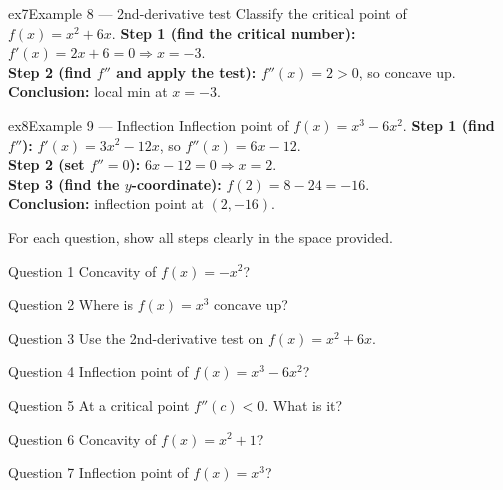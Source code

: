 \documentclass[11pt]{article}
\begin{document}
\begin{example}{ex7}{Example 8 --- 2nd-derivative test}
Classify the critical point of $f(x)=x^2+6x$.\soln
\textbf{Step 1 (find the critical number):} $f'(x)=2x+6=0\Rightarrow x=-3$.\\[3pt]
\textbf{Step 2 (find $f''$ and apply the test):} $f''(x)=2>0$, so concave up.\\[3pt]
\textbf{Conclusion:} local min at $x=-3$.
\end{example}

\begin{example}{ex8}{Example 9 --- Inflection}
Inflection point of $f(x)=x^3-6x^2$.\soln
\textbf{Step 1 (find $f''$):} $f'(x)=3x^2-12x$, so $f''(x)=6x-12$.\\[3pt]
\textbf{Step 2 (set $f''=0$):} $6x-12=0\Rightarrow x=2$.\\[3pt]
\textbf{Step 3 (find the $y$-coordinate):} $f(2)=8-24=-16$.\\[3pt]
\textbf{Conclusion:} inflection point at $(2,-16)$.
\end{example}

\clearpage
{}
For each question, show all steps clearly in the space provided.

\begin{qbox}{Question 1}
Concavity of $f(x)=-x^2$?\workspace{2.4cm}
\end{qbox}

\begin{qbox}{Question 2}
Where is $f(x)=x^3$ concave up?\workspace{2.4cm}
\end{qbox}

\begin{qbox}{Question 3}
Use the 2nd-derivative test on $f(x)=x^2+6x$.\workspace{2.4cm}
\end{qbox}

\begin{qbox}{Question 4}
Inflection point of $f(x)=x^3-6x^2$?\workspace{2.4cm}
\end{qbox}

\begin{qbox}{Question 5}
At a critical point $f''(c)<0$. What is it?\workspace{2.4cm}
\end{qbox}

\begin{qbox}{Question 6}
Concavity of $f(x)=x^2+1$?\workspace{2.4cm}
\end{qbox}

\begin{qbox}{Question 7}
Inflection point of $f(x)=x^3$?\workspace{2.4cm}
\end{qbox}
\end{document}
